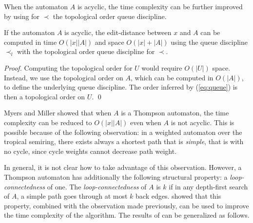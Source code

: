 \documentclass{llncs}
\newcommand{\0}{\overline{0}}
\newcommand{\1}{\overline{1}}
\newcommand{\+}{\oplus}
\renewcommand{\.}{\otimes}
\begin{document}
When the automaton $A$ is acyclic, the time complexity can be further
improved by using for $\prec$ the topological order queue discipline.
\begin{corollary}
\label{cor:acyclic}
If the automaton $A$ is acyclic, the edit-distance between $x$ and $A$
can be computed in time $O(|x| |A|)$ and space $O(|x| + |A|)$ using
the queue discipline $\prec_l$ with the topological order queue
discipline for $\prec$.
\end{corollary}
\begin{proof}
  Computing the topological order for $U$ would require $O(|U|)$
  space.  Instead, we use the topological order on $A$, which can be
  computed in $O(|A|)$, to define the underlying queue discipline.
  The order inferred by (\ref{eq:queue}) is then a topological order
  on $U$.  \qed
\end{proof}

Myers and Miller \cite{myers-miller89} showed that when $A$ is a
Thompson automaton, the time complexity can be reduced to $O(|x| |A|)$
even when $A$ is not acyclic.  This is possible because of the
following observation: in a weighted automaton over the tropical
semiring, there exists always a shortest path that is \emph{simple},
that is with no cycle, since cycle weights cannot decrease 
path weight.

In general, it is not clear how to take advantage of this
observation. However, a Thompson automaton has additionally the
following structural property: a \emph{loop-connectedness} of one.
The \emph{loop-connectedness} of $A$ is $k$ if in any depth-first
search of $A$, a simple path goes through at most $k$ back
edges. \cite{myers-miller89} showed that this property, combined with
the observation made previously, can be used to improve the time
complexity of the algorithm.  The results of \cite{myers-miller89} can
be generalized as follows.
\end{document}

